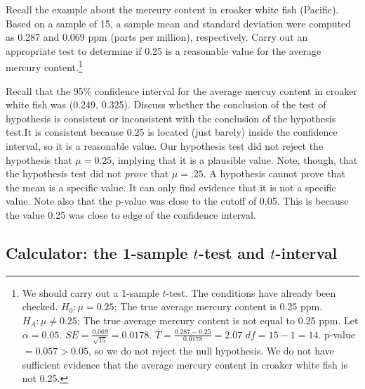 \begin{exercise}Recall the example about the mercury content in croaker white fish (Pacific). Based on a sample of 15, a sample mean and standard deviation were computed as 0.287 and 0.069 ppm (parts per million), respectively. Carry out an appropriate test to determine if 0.25 is a reasonable value for the average mercury content.\footnote{We should carry out a 1-sample $t$-test. The conditions have already been checked. $H_0: \mu=0.25$; The true average mercury content is 0.25 ppm. $H_A: \mu \ne 0.25$; The true average mercury content is not equal to 0.25 ppm. Let $\alpha=0.05$. $SE = \frac{0.069}{\sqrt{15}} = 0.0178$. $T=\frac{0.287-0.25}{0.0178}=2.07$  $df=15-1=14$. p-value$=0.057>0.05$, so we do not reject the null hypothesis. We do not have sufficient evidence that the average mercury content in croaker white fish is not 0.25.}
\end{exercise}

\textA{\newpage}

\begin{example}{Recall that the 95\% confidence interval for the average mercuy content in croaker white fish was (0.249, 0.325). Discuss whether the conclusion of the test of hypothesis is consistent or inconsistent with the conclusion of the hypothesis test.}It is consistent because 0.25 is located (just barely) inside the confidence interval, so it is a reasonable value. Our hypothesis test did not reject the hypothesis that $\mu=0.25$, implying that it is a plausible value. Note, though, that the hypothesis test did not \emph{prove} that $\mu=.25$. A hypothesis cannot prove that the mean is a specific value. It can only find evidence that it is not a specific value. Note also that the p-value was close to the cutoff of 0.05. This is because the value 0.25 was close to edge of the confidence interval.
\end{example}

\subsection{Calculator: the 1-sample $t$-test and $t$-interval}

